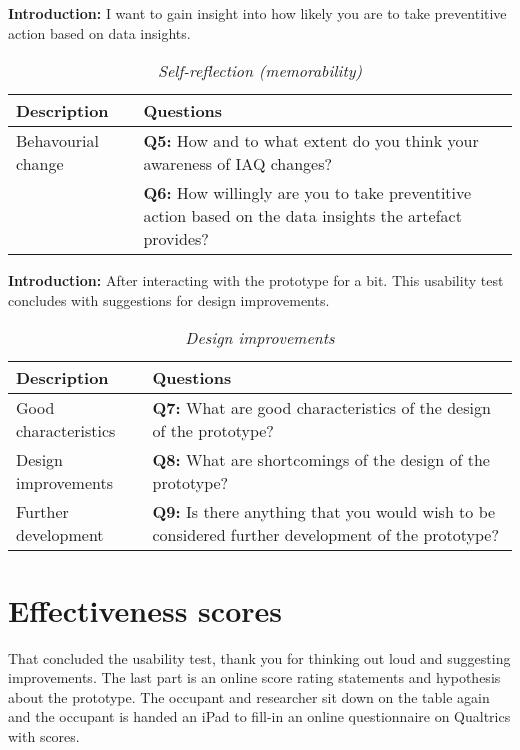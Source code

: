 \begin{appendices}
\begin{table}[htbp]
    \captionsetup{justification=raggedright,singlelinecheck=false}
    \caption{\textit{Self-reflection (memorability)}}
    \raggedright \textbf{Introduction:} I want to gain insight into how likely you are to take preventitive action based on data insights.
    \label{tab:column_widths}
    \begin{tabularx}{\textwidth}{|p{}|X|}
        \hline
        \textbf{Description} & \textbf{Questions} \\
        \hline
        Behavourial change & 
        \textbf{Q5:} How and to what extent do you think your awareness of IAQ changes? \\
        & \textbf{Q6:} How willingly are you to take preventitive action based on the data insights the artefact provides? \\
        \hline
    \end{tabularx}
\end{table}


\begin{table}[htbp]
    \captionsetup{justification=raggedright,singlelinecheck=false}
    \caption{\textit{Design improvements}}
    \raggedright \textbf{Introduction:} After interacting with the prototype for a bit. This usability test concludes with suggestions for design improvements.
    \label{tab:column_widths}
    \begin{tabularx}{\textwidth}{|p{}|X|}
        \hline
        \textbf{Description} & \textbf{Questions} \\
        \hline
        Good characteristics & \textbf{Q7:} What are good characteristics of the design of the prototype? \\
        \hline
        Design improvements & \textbf{Q8:} What are shortcomings of the design of the prototype? \\
        \hline
        Further development & \textbf{Q9:} Is there anything that you would wish to be considered further development of the prototype? \\
        \hline
    \end{tabularx}
\end{table}

\section{Effectiveness scores}
\label{appendix:effectiveness}

That concluded the usability test, thank you for thinking out loud and suggesting improvements. The last part is an online score rating statements and hypothesis about the prototype. The occupant and researcher sit down on the table again and the occupant is handed an iPad to fill-in an online questionnaire on Qualtrics with scores.


\end{appendices}
